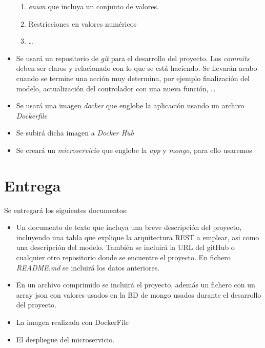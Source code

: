 \documentclass{article}
\begin{document}
\begin{itemize}
\begin{enumerate}
\item \emph{enum} que incluya un conjunto de valores.
\item Restricciones en valores numéricos
\item \dots 
\end{enumerate}
\item Se usará un repositorio de \emph{git} para el desarrollo del proyecto. Los \emph{commits} deben ser claros y relacionado con lo que se está haciendo. Se llevarán acabo cuando se termine una acción muy determina, por ejemplo finalización del modelo, actualización del controlador con una nueva función, \dots
\item Se usará una imagen \emph{docker} que englobe la aplicación usando un archivo \emph{Dockerfile}
\item Se subirá dicha imagen a \emph{Docker Hub}
\item Se creará un \emph{microservicio} que englobe la \emph{app} y \emph{mongo}, para ello usaremos 
\end{itemize}





\section{Entrega}
Se entregará los siguientes documentos:
\begin{itemize}
\item Un documento de texto que incluya una breve descripción del proyecto, incluyendo una tabla que explique la arquitectura REST a emplear, asi como una descripción del modelo. También se incluirá la URL del gitHub o cualquier otro repositorio donde se encuentre el proyecto. En fichero \emph{README.md} se incluirá los datos anteriores.
\item En un archivo comprimido se incluirá el proyecto, además un fichero con un array json con valores usados en la BD de mongo usados durante el desarrollo del proyecto.
\item La imagen realizada con DockerFile
\item El despliegue del microservicio.
\end{itemize}

\newpage
\end{document}
